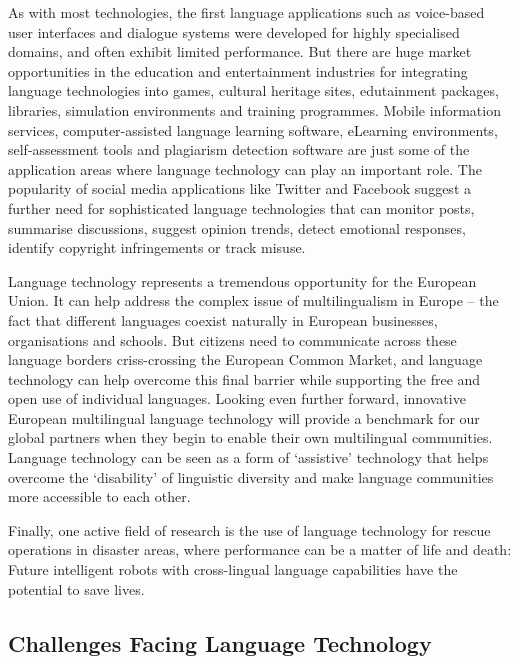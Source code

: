 \begin{multicols}{2}
\begin{itemize}
\begin{multicols}{2}
    As with most technologies, the first language applications such as voice-based user interfaces and dialogue systems were developed for highly specialised domains, and often exhibit limited performance. But there are huge market opportunities in the education and entertainment industries for integrating language technologies into games, cultural heritage sites, edutainment packages, libraries, simulation environments and training programmes. Mobile information services, computer-assisted language learning software, eLearning environments, self-assessment tools and plagiarism detection software are just some of the application areas where language technology can play an important role. The popularity of social media applications like Twitter and Facebook suggest a further need for sophisticated language technologies that can monitor posts, summarise discussions, suggest opinion trends, detect emotional responses, identify copyright infringements or track misuse.


    Language technology represents a tremendous opportunity for the European Union. It can help address the complex issue of multilingualism in Europe – the fact that different languages coexist naturally in European businesses, organisations and schools. But citizens need to communicate across these language borders criss-crossing the European Common Market, and language technology can help overcome this final barrier while supporting the free and open use of individual languages. Looking even further forward, innovative European multilingual language technology will provide a benchmark for our global partners when they begin to enable their own multilingual communities. Language technology can be seen as a form of ‘assistive’ technology that helps overcome the ‘disability’ of linguistic diversity and make language communities more accessible to each other.

    Finally, one active field of research is the use of language technology for rescue operations in disaster areas, where performance can be a matter of life and death: Future intelligent robots with cross-lingual language capabilities have the potential to save lives.

\subsection{Challenges Facing Language Technology}


\end{multicols}
\end{itemize}
\end{multicols}
